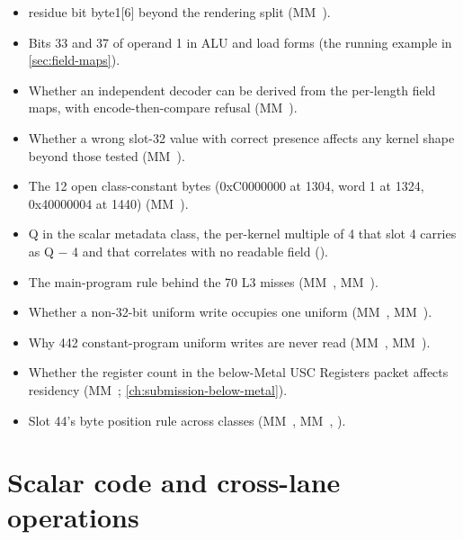 \begin{itemize}
\item {} residue bit byte1{[}6{]} beyond the rendering split (MM~).
\item Bits 33 and 37 of operand 1 in ALU and load forms (the running example in \cref{sec:field-maps}).
\item Whether an independent decoder can be derived from the per-length field maps, with encode-then-compare refusal (MM~).
\item Whether a wrong slot-32 value with correct presence affects any kernel shape beyond those tested (MM~).
\item The 12 open class-constant bytes (0xC0000000 at 1304, word 1 at 1324, 0x40000004 at 1440) (MM~).
\item Q in the scalar metadata class, the per-kernel multiple of 4 that slot 4 carries as Q $-$ 4 and that correlates with no readable field ().
\item The main-program rule behind the 70 L3 misses (MM~, MM~).
\item Whether a non-32-bit uniform write occupies one uniform (MM~, MM~).
\item Why 442 constant-program uniform writes are never read (MM~, MM~).
\item Whether the register count in the below-Metal USC Registers packet affects residency (MM~; \cref{ch:submission-below-metal}).
\item Slot 44's byte position rule across classes (MM~, MM~, ).
\end{itemize}

\section{Scalar code and cross-lane operations}\label{sec:scalar-arithmetic-control}

